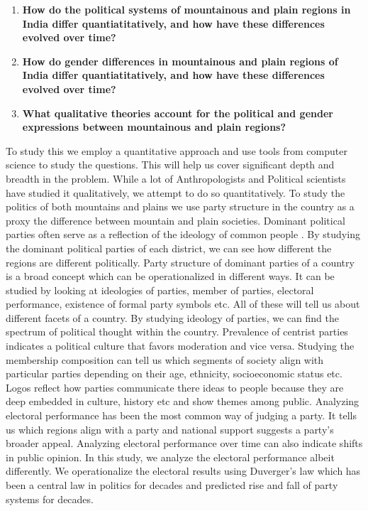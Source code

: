 \begin{sloppypar}
\begin{enumerate}
    \item \textbf{How do the political systems of mountainous and plain regions in India differ quantiatitatively, and how have these differences evolved over time? }
    \item \textbf{How do gender differences in mountainous and plain regions of India differ quantiatitatively, and how have these differences evolved over time?}
    \item \textbf{What qualitative theories account for the political and gender expressions between mountainous and plain regions?}
\end{enumerate}

To study this we employ a quantitative approach and use tools from computer science to study the questions. This will help us cover significant depth and breadth in the problem. While a lot of Anthropologists and Political scientists have studied it qualitatively, we attempt to do so quantitatively. To study the politics of both mountains and plains we use party structure in the country as a proxy  the difference between mountain and plain societies. Dominant political parties often serve as a reflection of the ideology of common people \citep{romeijn2020political}. By studying the dominant political parties of each district, we can see how different the regions are different politically. Party structure of dominant parties of a country is a broad concept which can be operationalized in different ways. It can be studied by looking at ideologies of parties, member of parties, electoral performance, existence of formal party symbols etc. All of these will tell us about different facets of a country. By studying ideology of parties, we can find the spectrum of political thought within the country. Prevalence of centrist parties indicates a political culture that favors moderation and vice versa. Studying the membership composition can tell us  which segments of society align with particular parties depending on their age, ethnicity, socioeconomic status etc. Logos reflect how parties communicate there ideas to people because they are deep embedded in culture, history etc and show themes among public. Analyzing electoral performance has been the most common way of judging a party. It tells us which regions align with a party and national support suggests a party's broader appeal. Analyzing electoral performance over time can also indicate shifts in public opinion. In this study, we analyze the electoral performance albeit differently. We operationalize the electoral results using Duverger's law which has been a central law in politics for decades and predicted rise and fall of party systems for decades. 


\end{sloppypar}
